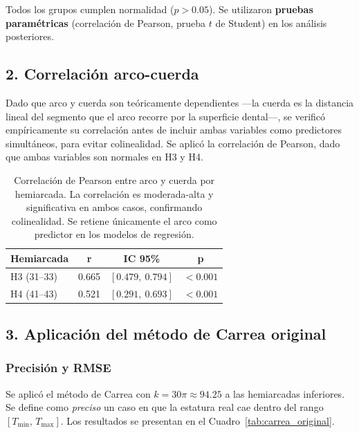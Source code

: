 \documentclass[11pt,letterpaper]{article}
\begin{document}
Todos los grupos cumplen normalidad ($p > 0.05$). Se utilizaron \textbf{pruebas paramétricas} (correlación de Pearson, prueba $t$ de Student) en los análisis posteriores.

\subsection*{2. Correlación arco-cuerda}

Dado que arco y cuerda son teóricamente dependientes —la cuerda es la distancia lineal del segmento que el arco recorre por la superficie dental—, se verificó empíricamente su correlación antes de incluir ambas variables como predictores simultáneos, para evitar colinealidad. Se aplicó la correlación de Pearson, dado que ambas variables son normales en H3 y H4.

\begin{table}[h!]
\centering
\begin{tabular}{lccc}
\toprule
\textbf{Hemiarcada} & \textbf{r} & \textbf{IC 95\%} & \textbf{p} \\
\midrule
H3 (31--33) & 0.665 & $[0.479,\ 0.794]$ & $<0.001$ \\
H4 (41--43) & 0.521 & $[0.291,\ 0.693]$ & $<0.001$ \\
\bottomrule
\end{tabular}
\caption{Correlación de Pearson entre arco y cuerda por hemiarcada. La correlación es moderada-alta y significativa en ambos casos, confirmando colinealidad. Se retiene únicamente el arco como predictor en los modelos de regresión.}
\label{tab:cor_arco_cuerda}
\end{table}

\subsection*{3. Aplicación del método de Carrea original}

\subsubsection*{Precisión y RMSE}

Se aplicó el método de Carrea con $k = 30\pi \approx 94.25$ a las hemiarcadas inferiores. Se define como \textit{preciso} un caso en que la estatura real cae dentro del rango $[T_{\min},\, T_{\max}]$. Los resultados se presentan en el Cuadro~\ref{tab:carrea_original}.
\end{document}
